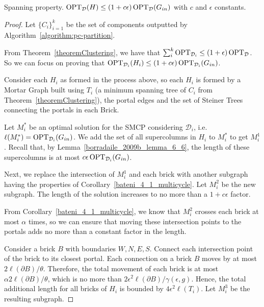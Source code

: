 \begin{lemma}\label{spanner_spanning_property}
    Spanning property. \(\operatorname{\textrm{OPT}}_{\mathcal{D}}(H) \leq (1 + c \epsilon) \operatorname{\textrm{OPT}}_{\mathcal{D}}(G_{in})\) with \(c\) and \(\epsilon\) constants.
\end{lemma}
\begin{proof}

    Let \(\{C_i\}_{i=1}^k\) be the set of components outputted by Algorithm~\ref{algorithm:pc-partition}.

    From Theorem~\ref{theoremClustering}, we have that \(\sum_{i}^k \operatorname{\textrm{OPT}}_{\mathcal{D}_i} \leq (1 + \epsilon) \operatorname{\textrm{OPT}}_{\mathcal{D}}\). So we can focus on proving that \(\operatorname{\textrm{OPT}}_{\mathcal{D}_i}(H_i) \leq (1 + c \epsilon) \operatorname{\textrm{OPT}}_{\mathcal{D}_i}(G_{in})\).

    Consider each \(H_i\) as formed in the process above, so each \(H_i\) is formed by a Mortar Graph built using \(T_i\) (a minimum spanning tree of \(C_i\) from Theorem~\ref{theoremClustering}), the portal edges and the set of Steiner Trees connecting the portals in each Brick.

    Let \(M^\ast_i\) be an optimal solution for the SMCP considering \(\mathcal{D}_i\), i.e. \(\ell(M^\ast_i) = \operatorname{\textrm{OPT}}_{\mathcal{D}_i}(G_{in})\). We add the set of all supercolumns in \(H_i\) to \(M^\ast_i\) to get \(M^1_i\). Recall that, by Lemma~\ref{borradaile_2009b_lemma_6_6}, the length of these supercolumns is at most \(c \epsilon \operatorname{\textrm{OPT}}_{\mathcal{D}_i}(G_{in})\).

    Next, we replace the intersection of \(M_i^1\) and each brick with another subgraph having the properties of  Corollary~\ref{bateni_4_1_multicycle}. Let \(M_i^2\) be the new subgraph. The length of the solution increases to no more than a \(1 + c \epsilon\) factor.

    From  Corollary~\ref{bateni_4_1_multicycle}, we know that \(M_i^2\) crosses each brick at most \(\alpha\) times, so we can ensure that moving these intersection points to the portals adds no more than a constant factor in the length.

    Consider a brick \(B\) with boundaries \(W, N, E, S\). Connect each intersection point of the brick to its closest portal. Each connection on a brick \(B\) moves by at most \(2 \ell(\partial B) / \theta\). Therefore, the total movement of each brick is at most \(\alpha 2 \ell(\partial B) / \theta\), which is no more than \(2 \epsilon^2 \ell(\partial B) / \gamma(\epsilon, g)\). Hence, the total additional length for all bricks of \(H_i\) is bounded by \(4 \epsilon^2 \ell(T_i)\). Let \(M_i^3\) be the resulting subgraph.


\end{proof}
